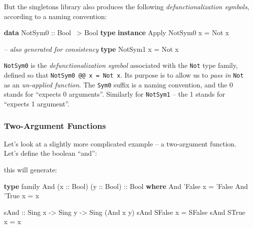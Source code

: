 \documentclass[]{article}
\newenvironment{Shaded}{}{}
\newcommand{\CommentTok}[1]{\textcolor[rgb]{0.38,0.63,0.69}{\textit{#1}}}
\newcommand{\DataTypeTok}[1]{\textcolor[rgb]{0.56,0.13,0.00}{#1}}
\newcommand{\FunctionTok}[1]{\textcolor[rgb]{0.02,0.16,0.49}{#1}}
\newcommand{\KeywordTok}[1]{\textcolor[rgb]{0.00,0.44,0.13}{\textbf{#1}}}
\newcommand{\NormalTok}[1]{#1}
\newcommand{\OtherTok}[1]{\textcolor[rgb]{0.00,0.44,0.13}{#1}}
\begin{document}
But the singletons library also produces the following \emph{defunctionalization
symbols}, according to a naming convention:

\begin{Shaded}
\begin{Highlighting}[]
\KeywordTok{data} \DataTypeTok{NotSym0}\OtherTok{ ::} \DataTypeTok{Bool} \FunctionTok{~>} \DataTypeTok{Bool}
\KeywordTok{type} \KeywordTok{instance} \DataTypeTok{Apply} \DataTypeTok{NotSym0}\NormalTok{ x }\FunctionTok{=} \DataTypeTok{Not}\NormalTok{ x}

\CommentTok{-- also generated for consistency}
\KeywordTok{type} \DataTypeTok{NotSym1}\NormalTok{ x }\FunctionTok{=} \DataTypeTok{Not}\NormalTok{ x}
\end{Highlighting}
\end{Shaded}

\texttt{NotSym0} is the \emph{defunctionalization symbol} associated with the
\texttt{Not} type family, defined so that \texttt{NotSym0\ @@\ x\ =\ Not\ x}.
Its purpose is to allow us to \emph{pass in} \texttt{Not} as an \emph{un-applied
function}. The \texttt{Sym0} suffix is a naming convention, and the 0 stands for
``expects 0 arguments''. Similarly for \texttt{NotSym1} -- the 1 stands for
``expects 1 argument''.

\hypertarget{two-argument-functions}{%
\subsubsection{Two-Argument Functions}\label{two-argument-functions}}

Let's look at a slightly more complicated example -- a two-argument function.
Let's define the boolean ``and'':

\begin{Shaded}
\end{Shaded}

this will generate:

\begin{Shaded}
\begin{Highlighting}[]
\KeywordTok{type}\NormalTok{ family }\DataTypeTok{And}\NormalTok{ (}\OtherTok{x ::} \DataTypeTok{Bool}\NormalTok{) (}\OtherTok{y ::} \DataTypeTok{Bool}\NormalTok{)}\OtherTok{ ::} \DataTypeTok{Bool} \KeywordTok{where}
    \DataTypeTok{And}\NormalTok{ '}\DataTypeTok{False}\NormalTok{ x }\FunctionTok{=}\NormalTok{ '}\DataTypeTok{False}
    \DataTypeTok{And}\NormalTok{ '}\DataTypeTok{True}\NormalTok{  x }\FunctionTok{=}\NormalTok{ x}

\OtherTok{sAnd ::} \DataTypeTok{Sing}\NormalTok{ x }\OtherTok{->} \DataTypeTok{Sing}\NormalTok{ y }\OtherTok{->} \DataTypeTok{Sing}\NormalTok{ (}\DataTypeTok{And}\NormalTok{ x y)}
\NormalTok{sAnd }\DataTypeTok{SFalse}\NormalTok{ x }\FunctionTok{=} \DataTypeTok{SFalse}
\NormalTok{sAnd }\DataTypeTok{STrue}\NormalTok{  x }\FunctionTok{=}\NormalTok{ x}
\end{Highlighting}
\end{Shaded}
\end{document}
